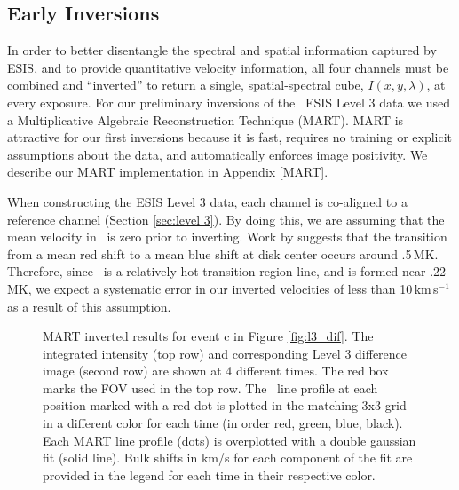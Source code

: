     
    
    \subsection{Early Inversions} \label{sec:inversions}
    	In order to better disentangle the spectral and spatial information captured by ESIS, and to provide quantitative velocity information, all four channels must be combined and ``inverted'' to return a single, spatial-spectral cube, $I(x,y,\lambda)$, at every exposure.
    	For our preliminary inversions of the \ov \  ESIS Level 3 data we used a Multiplicative Algebraic Reconstruction Technique (MART).
    	MART is attractive for our first inversions because it is fast, requires no training or explicit assumptions about the data, and automatically enforces image  positivity.
    	We describe our MART implementation in Appendix \ref{MART}.
    	
    	When constructing the ESIS Level 3 data, each channel is co-aligned to a reference channel (Section \ref{sec:level 3}).
    	By doing this, we are assuming that the mean velocity in \ov \ is zero prior to inverting.
    	Work by \citet{Peter1999} suggests that the transition from a mean red shift to a mean blue shift at disk center occurs around .5\,MK.
    	Therefore, since \ov \ is a relatively hot transition region line, and is formed near .22\,MK, we expect a systematic error in our inverted velocities of less than 10\,km\,s$^{-1}$ as a result of this assumption.
    	 
    	
    	\begin{figure}
    		\caption{MART inverted results for event c in Figure \ref{fig:l3_dif}. The integrated intensity (top row) and corresponding Level 3 difference image (second row) are shown at 4 different times. The red box marks the FOV used in the top row.  The \ov \ line profile at each position marked with a red dot is plotted in the matching 3x3 grid in a different color for each time (in order red, green, blue, black). Each MART line profile (dots) is overplotted with a double gaussian fit (solid line).  Bulk shifts in km/s for each component of the fit are provided in the legend for each time in their respective color. }
    		\label{fig:perfect_x_inverted}
    	\end{figure}
        
